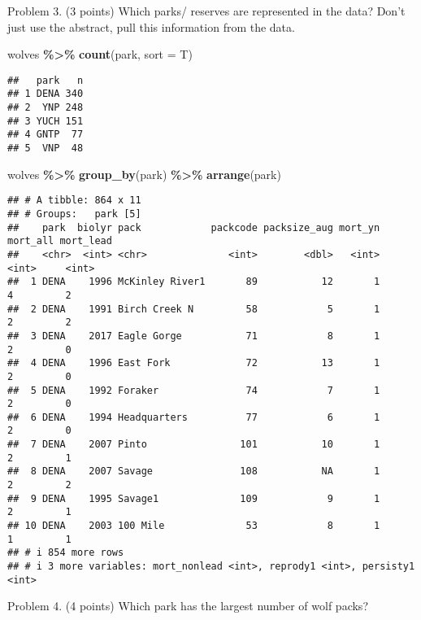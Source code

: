 \documentclass[
]{article}
\newenvironment{Shaded}{\begin{snugshade}}{\end{snugshade}}
\newcommand{\AttributeTok}[1]{\textcolor[rgb]{0.13,0.29,0.53}{#1}}
\newcommand{\FunctionTok}[1]{\textcolor[rgb]{0.13,0.29,0.53}{\textbf{#1}}}
\newcommand{\NormalTok}[1]{#1}
\newcommand{\SpecialCharTok}[1]{\textcolor[rgb]{0.81,0.36,0.00}{\textbf{#1}}}
\begin{document}
Problem 3. (3 points) Which parks/ reserves are represented in the data?
Don't just use the abstract, pull this information from the data.

\begin{Shaded}
\begin{Highlighting}[]
\NormalTok{wolves }\SpecialCharTok{\%\textgreater{}\%} 
  \FunctionTok{count}\NormalTok{(park, }\AttributeTok{sort =}\NormalTok{ T)}
\end{Highlighting}
\end{Shaded}

\begin{verbatim}
##   park   n
## 1 DENA 340
## 2  YNP 248
## 3 YUCH 151
## 4 GNTP  77
## 5  VNP  48
\end{verbatim}

\begin{Shaded}
\begin{Highlighting}[]
\NormalTok{wolves }\SpecialCharTok{\%\textgreater{}\%} 
  \FunctionTok{group\_by}\NormalTok{(park) }\SpecialCharTok{\%\textgreater{}\%} 
  \FunctionTok{arrange}\NormalTok{(park)}
\end{Highlighting}
\end{Shaded}

\begin{verbatim}
## # A tibble: 864 x 11
## # Groups:   park [5]
##    park  biolyr pack            packcode packsize_aug mort_yn mort_all mort_lead
##    <chr>  <int> <chr>              <int>        <dbl>   <int>    <int>     <int>
##  1 DENA    1996 McKinley River1       89           12       1        4         2
##  2 DENA    1991 Birch Creek N         58            5       1        2         2
##  3 DENA    2017 Eagle Gorge           71            8       1        2         0
##  4 DENA    1996 East Fork             72           13       1        2         0
##  5 DENA    1992 Foraker               74            7       1        2         0
##  6 DENA    1994 Headquarters          77            6       1        2         0
##  7 DENA    2007 Pinto                101           10       1        2         1
##  8 DENA    2007 Savage               108           NA       1        2         2
##  9 DENA    1995 Savage1              109            9       1        2         1
## 10 DENA    2003 100 Mile              53            8       1        1         1
## # i 854 more rows
## # i 3 more variables: mort_nonlead <int>, reprody1 <int>, persisty1 <int>
\end{verbatim}

Problem 4. (4 points) Which park has the largest number of wolf packs?
\end{document}
